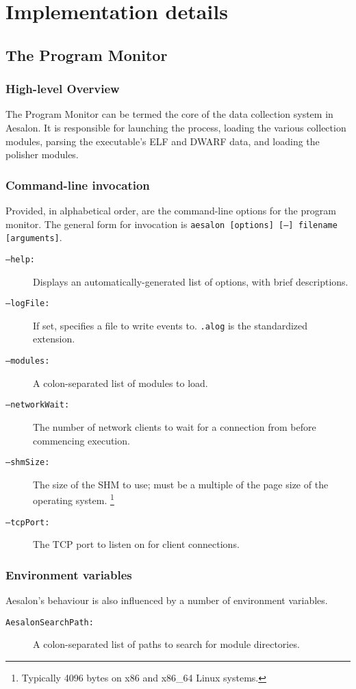 \chapter{Implementation details}
\section{The Program Monitor}
\subsection{High-level Overview}
The Program Monitor can be termed the core of the data collection system in Aesalon. It is responsible for
launching the process, loading the various collection modules, parsing the executable's ELF and DWARF data,
and loading the polisher modules.

\subsection{Command-line invocation}
Provided, in alphabetical order, are the command-line options for the program monitor. The general form
for invocation is \texttt{aesalon [options] [--] filename [arguments]}.
\begin{description}
 \item[\texttt{--help:}] Displays an automatically-generated list of options, with brief descriptions.
 \item[\texttt{--logFile:}] If set, specifies a file to write events to. \texttt{.alog} is the standardized extension.
 \item[\texttt{--modules:}] A colon-separated list of modules to load.
 \item[\texttt{--networkWait:}] The number of network clients to wait for a connection from before commencing
execution.
 \item[\texttt{--shmSize:}] The size of the SHM to use; must be a multiple of the page size of the operating system.%
  \footnote{Typically 4096 bytes on x86 and x86\_64 Linux systems.}
 \item[\texttt{--tcpPort:}] The TCP port to listen on for client connections.
\end{description}

\subsection{Environment variables}
Aesalon's behaviour is also influenced by a number of environment variables.
\begin{description}
 \item[\texttt{AesalonSearchPath:}] A colon-separated list of paths to search for module directories.
\end{description}

